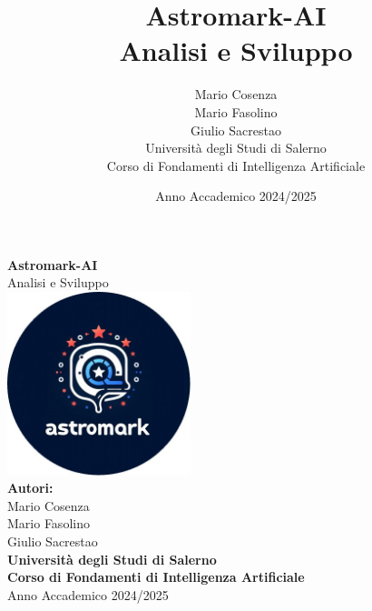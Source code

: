 \documentclass[a4paper,12pt]{report}
\title{\textbf{Astromark-AI}\\ \large Analisi e Sviluppo}
\author{Mario Cosenza \\ Mario Fasolino \\ Giulio Sacrestao \\ Università degli Studi di Salerno \\ Corso di Fondamenti di Intelligenza Artificiale}
\date{Anno Accademico 2024/2025}
\begin{document}
\begin{titlepage}
    \centering
    \vspace*{2cm}
    {\Huge \textbf{Astromark-AI}}\\[1.5cm]
    {\Large Analisi e Sviluppo}\\[2cm]
    \includegraphics[width=0.4\textwidth]{images/astromarkLogo.jpg}\\[2cm]
    {\large \textbf{Autori:}}\\
    Mario Cosenza\\
    Mario Fasolino\\
    Giulio Sacrestao\\[1cm]
    {\large \textbf{Università degli Studi di Salerno}}\\
    {\large \textbf{Corso di Fondamenti di Intelligenza Artificiale}}\\[1cm]
    {\large Anno Accademico 2024/2025}
    \vfill
\end{titlepage}

\newpage

\pagestyle{fancy}
\fancyhf{}
\fancyfoot[C]{\thepage}

\tableofcontents
\newpage











\appendix

\end{document}
